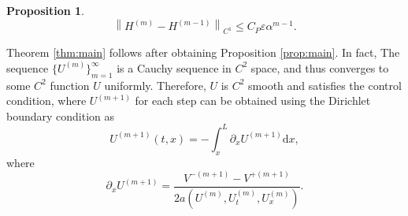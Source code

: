 \documentclass[a4paper,reqno,11pt]{amsart}
\numberwithin{equation}{section} %
\newtheorem{prop}[lem]{Proposition}
\begin{document}
\begin{prop}
\begin{equation}\label{cauchy h}
\left\lVert  H^{\left( m \right)}-H^{\left( m-1 \right)}\right\rVert  _{C^1}\leq C_P\varepsilon \alpha ^{m-1}.
\end{equation}
\end{prop}
Theorem \ref{thm:main} follows after obtaining Proposition \ref{prop:main}. In fact, The sequence $\{U ^{(m)}\} _{m=1} ^ \infty $ is a Cauchy sequence in $C^2$ space, and thus converges to some $C^2$ function $ U$ uniformly.%
Therefore, $U$ is $C^2$ smooth and satisfies the control condition, where $U^{(m+1)}$ for each step can be 
obtained using the Dirichlet boundary condition as
$$
U^{(m+1)}(t,x)=-\int_x^L \partial _x U^{(m+1)} \text{d} x,
$$
where
$$
\partial _x U^{(m+1)}=\frac{V^{-\left( m+1 \right) }-V^{+\left( m+1 \right)}}{ 2a\left({U}^{\left( m \right)} ,U_{t}^{\left( m \right)},U_{x}^{\left( m \right)} \right)}.
$$
\end{document}

